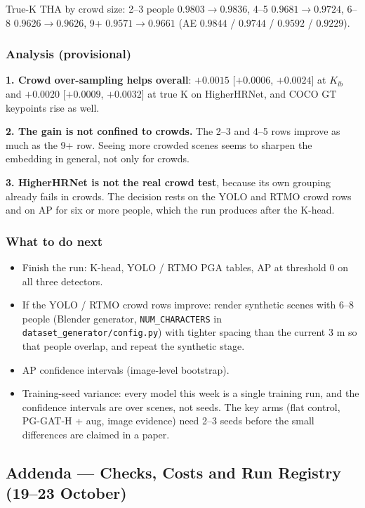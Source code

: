 True-K THA by crowd size: 2--3 people $0.9803 \rightarrow 0.9836$, 4--5 $0.9681 \rightarrow 0.9724$, 6--8 $0.9626 \rightarrow 0.9626$, 9+ $0.9571 \rightarrow 0.9661$ (AE $0.9844$ / $0.9744$ / $0.9592$ / $0.9229$).

\subsubsection{Analysis (provisional)}

\textbf{1. Crowd over-sampling helps overall}: $+0.0015$ [$+0.0006$, $+0.0024$] at $K_{lb}$ and $+0.0020$ [$+0.0009$, $+0.0032$] at true K on HigherHRNet, and COCO GT keypoints rise as well.

\textbf{2. The gain is not confined to crowds.} The 2--3 and 4--5 rows improve as much as the 9+ row. Seeing more crowded scenes seems to sharpen the embedding in general, not only for crowds.

\textbf{3. HigherHRNet is not the real crowd test}, because its own grouping already fails in crowds. The decision rests on the YOLO and RTMO crowd rows and on AP for six or more people, which the run produces after the K-head.

\subsubsection{What to do next}

\begin{itemize}
    \item Finish the run: K-head, YOLO / RTMO PGA tables, AP at threshold 0 on all three detectors.
    \item If the YOLO / RTMO crowd rows improve: render synthetic scenes with 6--8 people (Blender generator, \texttt{NUM\_CHARACTERS} in \texttt{dataset\_generator/config.py}) with tighter spacing than the current 3 m so that people overlap, and repeat the synthetic stage.
    \item AP confidence intervals (image-level bootstrap).
    \item Training-seed variance: every model this week is a single training run, and the confidence intervals are over scenes, not seeds. The key arms (flat control, PG-GAT-H + aug, image evidence) need 2--3 seeds before the small differences are claimed in a paper.
\end{itemize}

\subsection{Addenda --- Checks, Costs and Run Registry (19--23 October)}

